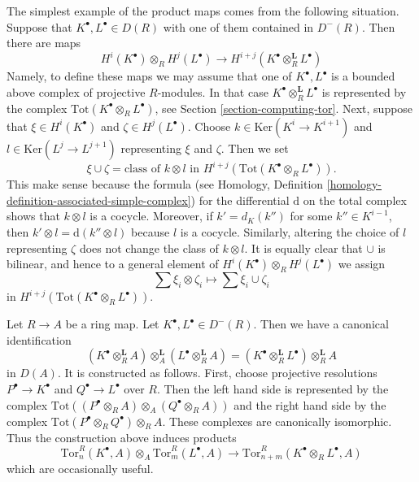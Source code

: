 \noindent
The simplest example of the product maps comes from the following situation.
Suppose that $K^\bullet, L^\bullet \in D(R)$ with one of them contained
in $D^{-}(R)$. Then there are maps
\begin{equation}
\label{equation-simple-tor-product}
H^i(K^\bullet) \otimes_R H^j(L^\bullet)
\longrightarrow
H^{i + j}(K^\bullet \otimes_R^{\mathbf{L}} L^\bullet)
\end{equation}
Namely, to define these maps we may assume that one of $K^\bullet, L^\bullet$
is a bounded above complex of projective $R$-modules. In that case
$K^\bullet \otimes_R^{\mathbf{L}} L^\bullet$ is represented by the
complex $\text{Tot}(K^\bullet \otimes_R L^\bullet)$, see
Section \ref{section-computing-tor}.
Next, suppose that $\xi \in H^i(K^\bullet)$ and $\zeta \in H^j(L^\bullet)$.
Choose $k \in \text{Ker}(K^i \to K^{i + 1})$ and
$l \in \text{Ker}(L^j \to L^{j + 1})$ representing $\xi$ and $\zeta$.
Then we set
$$
\xi \cup \zeta =
\text{class of }k \otimes l\text{ in }
H^{i + j}(\text{Tot}(K^\bullet \otimes_R L^\bullet)).
$$
This make sense because the formula (see
Homology, Definition \ref{homology-definition-associated-simple-complex})
for the differential $\text{d}$ on the total complex shows that
$k \otimes l$ is a cocycle. Moreover, if $k' = d_K(k'')$ for some
$k'' \in K^{i - 1}$, then $k' \otimes l = \text{d}(k'' \otimes l)$
because $l$ is a cocycle. Similarly, altering the choice of $l$
representing $\zeta$ does not change the class of $k \otimes l$.
It is equally clear that $\cup$ is bilinear, and hence
to a general element of $H^i(K^\bullet) \otimes_R H^j(L^\bullet)$
we assign
$$
\sum \xi_i \otimes \zeta_i \longmapsto \sum \xi_i \cup \zeta_i
$$
in $H^{i + j}(\text{Tot}(K^\bullet \otimes_R L^\bullet))$.

\medskip\noindent
Let $R \to A$ be a ring map. Let $K^\bullet, L^\bullet \in D^{-}(R)$.
Then we have a canonical identification
\begin{equation}
\label{equation-pullback-derived-tensor-product}
(K^\bullet \otimes_R^{\mathbf{L}} A)
\otimes_A^{\mathbf{L}}
(L^\bullet \otimes_R^{\mathbf{L}} A)
=
(K^\bullet \otimes_R^{\mathbf{L}} L^\bullet) \otimes_R^{\mathbf{L}} A
\end{equation}
in $D(A)$. It is constructed as follows. First, choose projective resolutions
$P^\bullet \to K^\bullet$ and $Q^\bullet \to L^\bullet$
over $R$. Then the left hand side is represented by the complex
$\text{Tot}((P^\bullet \otimes_R A) \otimes_A (Q^\bullet \otimes_R A))$
and the right hand side by the complex
$\text{Tot}(P^\bullet \otimes_R Q^\bullet) \otimes_R A$. These
complexes are canonically isomorphic. Thus the construction above
induces products
$$
\text{Tor}^R_n(K^\bullet, A) \otimes_A \text{Tor}^R_m(L^\bullet, A)
\longrightarrow \text{Tor}_{n + m}^R(K^\bullet \otimes_R L^\bullet, A)
$$
which are occasionally useful.

